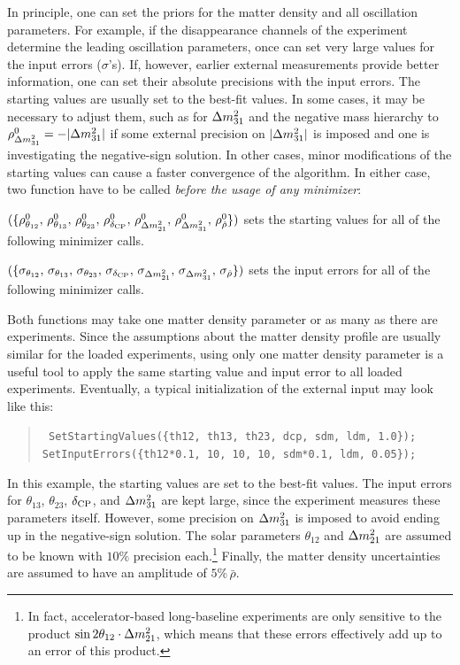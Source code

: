 In principle, one can set the priors for the matter density and all oscillation parameters. For example, if the disappearance channels of the experiment determine the leading oscillation parameters, once can set very large values for the input errors ($\sigma$'s). If, however, earlier external measurements provide better information, one can set their absolute precisions with the input errors. The starting values are usually set to the best-fit values. In some cases, it may be necessary to adjust them, such as for $\Delta m_{31}^2$ and the negative mass hierarchy to $\rho^0_{\Delta m_{31}^2} = - |\Delta m_{31}^2|$ if some external precision on $| \Delta m_{31}^2 |$ is imposed and one is investigating the negative-sign solution. In other cases, minor modifications of the starting values can cause a faster convergence of the algorithm.
In either case, two function have to be called {\em before the usage of any minimizer}:
\begin{function}
$(\{\rho^0_{\theta_{12}}, \, \rho^0_{\theta_{13}}, \, \rho^0_{\theta_{23}}, \, \rho^0_{\delta_{\mathrm{CP}}}, \, \rho^0_{\Delta m_{21}^2}, \, \rho^0_{\Delta m_{31}^2}, \, \rho^0_{\hat\rho} \})$ sets the starting values for all of the following minimizer calls.
\end{function}
\begin{function}
$(\{\sigma_{\theta_{12}}, \, \sigma_{\theta_{13}}, \, \sigma_{\theta_{23}}, \, \sigma_{\delta_{\mathrm{CP}}}, \, \sigma_{\Delta m_{21}^2}, \, \sigma_{\Delta m_{31}^2}, \, \sigma_{\hat\rho} \})$ sets the input errors for all of the following minimizer calls.
\end{function}
Both functions may take one matter density parameter or as many as there are experiments. Since the assumptions about the matter density profile are usually similar for the loaded experiments, using only one matter density parameter is a useful tool to apply the same starting value  and input error to all loaded experiments.
Eventually, a typical initialization of the external input may look like this:
\begin{quote}
{\tt
SetStartingValues(\{th12, th13, th23, dcp, sdm, ldm, 1.0\}); \\
SetInputErrors(\{th12*0.1, 10, 10, 10, sdm*0.1, ldm, 0.05\}); 
}
\end{quote}
In this example, the starting values are set to the best-fit values. The input errors for $\theta_{13}$, $\theta_{23}$, $\delta_{\mathrm{CP}}$, and $\Delta m_{31}^2$ are kept large, since the experiment measures these parameters itself. However, some precision on $\Delta m_{31}^2$ is imposed to avoid ending up in the negative-sign solution. The solar parameters $\theta_{12}$ and $\Delta m_{21}^2$ are assumed to be known with $10\%$ precision each.\footnote{In fact, accelerator-based long-baseline experiments are only sensitive to the product $\sin 2 \theta_{12} \cdot \Delta m_{21}^2$, which means that these errors effectively add up to an error of this product.} Finally, the matter density uncertainties are assumed to have an amplitude of $5\% \,  \bar\rho$.
 
